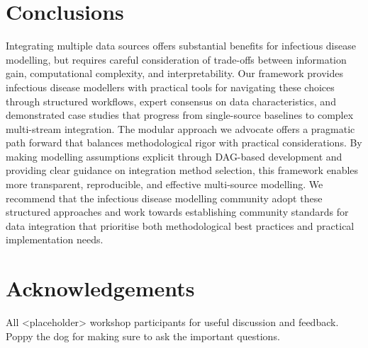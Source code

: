 \documentclass{article}
\begin{document}
\section{Conclusions}

Integrating multiple data sources offers substantial benefits for infectious disease modelling, but requires careful consideration of trade-offs between information gain, computational complexity, and interpretability.
Our framework provides infectious disease modellers with practical tools for navigating these choices through structured workflows, expert consensus on data characteristics, and demonstrated case studies that progress from single-source baselines to complex multi-stream integration.
The modular approach we advocate offers a pragmatic path forward that balances methodological rigor with practical considerations.
By making modelling assumptions explicit through DAG-based development and providing clear guidance on integration method selection, this framework enables more transparent, reproducible, and effective multi-source modelling.
We recommend that the infectious disease modelling community adopt these structured approaches and work towards establishing community standards for data integration that prioritise both methodological best practices and practical implementation needs.

\section{Acknowledgements}

All <placeholder> workshop participants for useful discussion and feedback. Poppy the dog for making sure to ask the important questions.



\end{document}
